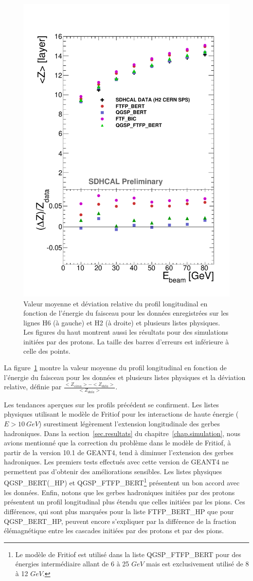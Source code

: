 \begin{figure}[!ht]
  \includegraphics[width=.48\textwidth]{Shower/figs/LONGIPROF_PION_MODEL_NOV.pdf}
  \caption{Valeur moyenne et déviation relative du profil longitudinal en fonction de l'énergie du faisceau pour les données enregistrées sur les lignes H6 (à gauche) et H2 (à droite) et plusieurs listes physiques. Les figures du haut montrent aussi les résultats pour des simulations initiées par des protons. La taille des barres d'erreurs est inférieure à celle des points.}
  \label{fig.longi_pi-_ebeam}
\end{figure}
La figure~\ref{fig.longi_pi-_ebeam} montre la valeur moyenne du profil longitudinal en fonction de l'énergie du faisceau pour les données et plusieurs listes physiques et la déviation relative, définie par $\frac{<Z_{simu}>-<Z_{data}>}{<Z_{data}>}$. 

Les tendances aperçues sur les profils précédent se confirment. Les listes physiques utilisant le modèle de Fritiof pour les interactions de haute énergie ($E > 10~GeV$) surestiment légèrement l'extension longitudinale des gerbes hadroniques. Dans la section~\ref{sec.resultats} du chapitre~\ref{chap.simulation}, nous avions mentionné que la correction du problème dans le modèle de Fritiof, à partir de la version 10.1 de GEANT4, tend à diminuer l'extension des gerbes hadroniques. Les premiers tests effectués avec cette version de GEANT4 ne permettent pas d'obtenir des améliorations sensibles. Les listes physiques QGSP\_BERT(\_HP) et QGSP\_FTFP\_BERT\footnote{Le modèle de Fritiof est utilisé dans la liste QGSP\_FTFP\_BERT pour des énergies intermédiaire allant de 6 à 25 $GeV$ mais est exclusivement utilisé de 8 à 12 $GeV$.} présentent un bon accord avec les données. Enfin, notons que les gerbes hadroniques initiées par des protons présentent un profil longitudinal plus étendu que celles initiées par les pions. Ces différences, qui sont plus marquées pour la liste FTFP\_BERT\_HP que pour QGSP\_BERT\_HP, peuvent encore s'expliquer par la différence de la fraction élémagnétique entre les cascades initiées par des protons et par des pions. 

